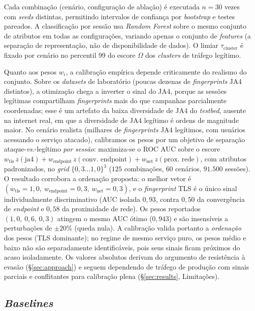 \documentclass[preprint,12pt]{elsarticle}
\begin{document}
Cada combinação (cenário, configuração de ablação) é executada $n = 30$ vezes com \emph{seeds} distintas, permitindo intervalos de confiança por \emph{bootstrap} e testes pareados. A classificação por sessão usa \emph{Random Forest} sobre o mesmo conjunto de atributos em todas as configurações, variando apenas o conjunto de \emph{features} (a separação de representação, não de disponibilidade de dados). O limiar $\tau_{\text{cluster}}$ é fixado por cenário no percentil 99 do escore $\Omega$ dos \emph{clusters} de tráfego legítimo.

Quanto aos pesos $w_i$, a calibração empírica depende criticamente do realismo do conjunto. Sobre os \emph{datasets} de laboratório (poucas dezenas de \emph{fingerprints} JA4 distintos), a otimização chega a inverter o sinal do JA4, porque as sessões legítimas compartilham \emph{fingerprints} mais do que campanhas parcialmente coordenadas; esse é um artefato da baixa diversidade de JA4 do \emph{testbed}, ausente na internet real, em que a diversidade de JA4 legítimo é ordens de magnitude maior. No cenário realista (milhares de \emph{fingerprints} JA4 legítimos, com usuários acessando o serviço atacado), calibramos os pesos por um objetivo de separação ataque-\emph{vs.}-legítimo \emph{por sessão}: maximiza-se o ROC AUC sobre o escore $w_{\text{tls}}\,z(\text{ja4}) + w_{\text{endpoint}}\,z(\text{conv. endpoint}) + w_{\text{net}}\,z(\text{prox. rede})$, com atributos padronizados, no \emph{grid} $\{0{,}3 \ldots 1{,}0\}^3$ ($125$ combinações, $60$ cenários, $91{.}500$ sessões). O resultado corrobora a ordenação proposta: o melhor vetor é $(w_{\text{tls}}{=}1{,}0,\ w_{\text{endpoint}}{=}0{,}3,\ w_{\text{net}}{=}0{,}3)$, e o \emph{fingerprint} TLS é o único sinal individualmente discriminativo (AUC isolada $0{,}93$, contra $0{,}50$ da convergência de \emph{endpoint} e $0{,}58$ da proximidade de rede). Os pesos reportados $(1{,}0,\ 0{,}6,\ 0{,}3)$ atingem o mesmo AUC ótimo ($0{,}943$) e são insensíveis a perturbações de $\pm 20\%$ (queda nula). A calibração valida portanto a \emph{ordenação} dos pesos (TLS dominante); no regime de mesmo serviço puro, os pesos médio e baixo não são separadamente identificáveis, pois seus sinais ficam próximos do acaso isoladamente. Os valores absolutos derivam do argumento de resistência à evasão (§\ref{sec:approach}) e seguem dependendo de tráfego de produção com sinais parciais e conflitantes para calibração plena (§\ref{sec:results}, Limitações).

\subsection{\emph{Baselines}}
\end{document}
